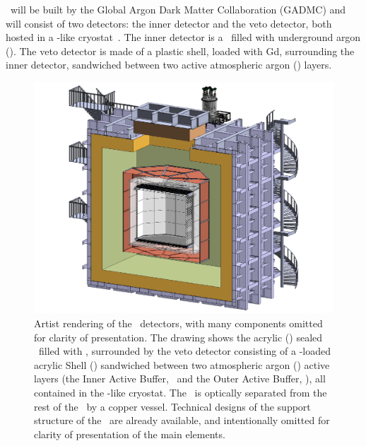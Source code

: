 \DSks\ will be built by the Global Argon Dark Matter Collaboration (GADMC) and will consist of two detectors: the inner detector and the veto detector, both hosted in a \pDUNE-like cryostat~\cite{Abi:2017wp,Acciarri:2016wz}.   The inner detector is a \LArTPC\ filled with underground argon (\UAr).  The veto detector is made of a plastic shell, loaded with Gd, surrounding the inner detector, sandwiched between two active atmospheric argon (\AAr) layers.  

\begin{figure}[t!]
\includegraphics[width=\columnwidth]{Figures/DSk3D.pdf}
\caption[Artist rendering of the \DSks\ detectors]{Artist rendering of the \DSks\ detectors, with many components omitted for clarity of presentation.  The drawing shows the acrylic (\PMMA) sealed \TPC\  filled with \UAr, surrounded by the veto detector consisting of a -loaded acrylic Shell (\GdAS) sandwiched between two atmospheric argon (\AAr) active layers (the Inner Active Buffer, \IAB\ and the Outer Active Buffer, \OAB), all contained in the \pDUNE-like cryostat.  The \OAB\ is optically separated from the rest of the  \AAr\ by a copper vessel.  Technical designs of the support structure of the \TPC\ are already available, and intentionally omitted for clarity of presentation of the main elements.}
\label{fig:DSk3D}
\end{figure}

